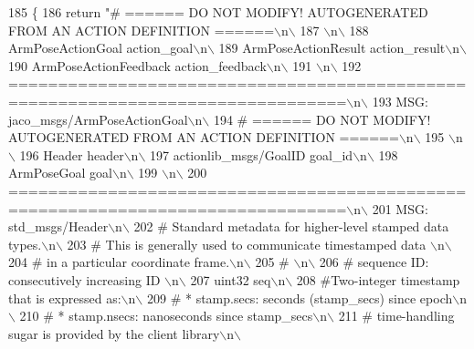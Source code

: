 \begin{DoxyCode}
185   \{
186     \textcolor{keywordflow}{return} \textcolor{stringliteral}{"# ====== DO NOT MODIFY! AUTOGENERATED FROM AN ACTION DEFINITION ======\(\backslash\)n\(\backslash\)}
187 \textcolor{stringliteral}{\(\backslash\)n\(\backslash\)}
188 \textcolor{stringliteral}{ArmPoseActionGoal action\_goal\(\backslash\)n\(\backslash\)}
189 \textcolor{stringliteral}{ArmPoseActionResult action\_result\(\backslash\)n\(\backslash\)}
190 \textcolor{stringliteral}{ArmPoseActionFeedback action\_feedback\(\backslash\)n\(\backslash\)}
191 \textcolor{stringliteral}{\(\backslash\)n\(\backslash\)}
192 \textcolor{stringliteral}{================================================================================\(\backslash\)n\(\backslash\)}
193 \textcolor{stringliteral}{MSG: jaco\_msgs/ArmPoseActionGoal\(\backslash\)n\(\backslash\)}
194 \textcolor{stringliteral}{# ====== DO NOT MODIFY! AUTOGENERATED FROM AN ACTION DEFINITION ======\(\backslash\)n\(\backslash\)}
195 \textcolor{stringliteral}{\(\backslash\)n\(\backslash\)}
196 \textcolor{stringliteral}{Header header\(\backslash\)n\(\backslash\)}
197 \textcolor{stringliteral}{actionlib\_msgs/GoalID goal\_id\(\backslash\)n\(\backslash\)}
198 \textcolor{stringliteral}{ArmPoseGoal goal\(\backslash\)n\(\backslash\)}
199 \textcolor{stringliteral}{\(\backslash\)n\(\backslash\)}
200 \textcolor{stringliteral}{================================================================================\(\backslash\)n\(\backslash\)}
201 \textcolor{stringliteral}{MSG: std\_msgs/Header\(\backslash\)n\(\backslash\)}
202 \textcolor{stringliteral}{# Standard metadata for higher-level stamped data types.\(\backslash\)n\(\backslash\)}
203 \textcolor{stringliteral}{# This is generally used to communicate timestamped data \(\backslash\)n\(\backslash\)}
204 \textcolor{stringliteral}{# in a particular coordinate frame.\(\backslash\)n\(\backslash\)}
205 \textcolor{stringliteral}{# \(\backslash\)n\(\backslash\)}
206 \textcolor{stringliteral}{# sequence ID: consecutively increasing ID \(\backslash\)n\(\backslash\)}
207 \textcolor{stringliteral}{uint32 seq\(\backslash\)n\(\backslash\)}
208 \textcolor{stringliteral}{#Two-integer timestamp that is expressed as:\(\backslash\)n\(\backslash\)}
209 \textcolor{stringliteral}{# * stamp.secs: seconds (stamp\_secs) since epoch\(\backslash\)n\(\backslash\)}
210 \textcolor{stringliteral}{# * stamp.nsecs: nanoseconds since stamp\_secs\(\backslash\)n\(\backslash\)}
211 \textcolor{stringliteral}{# time-handling sugar is provided by the client library\(\backslash\)n\(\backslash\)}

\end{DoxyCode}
